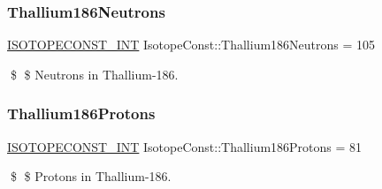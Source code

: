 \subsubsection{\texorpdfstring{Thallium186\+Neutrons}{Thallium186Neutrons}}
{\footnotesize\ttfamily \mbox{\hyperlink{group___isotope_const-_macros_ga5f18360b3e99483a35c32d789e62621c}{I\+S\+O\+T\+O\+P\+E\+C\+O\+N\+S\+T\+\_\+\+I\+NT}} Isotope\+Const\+::\+Thallium186\+Neutrons = 105}

\$ \$ Neutrons in Thallium-\/186. \mbox{\label{group___isotope_const-_thallium-_tl186_ga8c5be8ee75e662d742edf7b31061f5e0}} 
\subsubsection{\texorpdfstring{Thallium186\+Protons}{Thallium186Protons}}
{\footnotesize\ttfamily \mbox{\hyperlink{group___isotope_const-_macros_ga5f18360b3e99483a35c32d789e62621c}{I\+S\+O\+T\+O\+P\+E\+C\+O\+N\+S\+T\+\_\+\+I\+NT}} Isotope\+Const\+::\+Thallium186\+Protons = 81}

\$ \$ Protons in Thallium-\/186. 